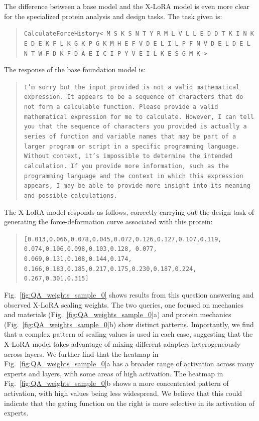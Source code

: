 The difference between a base model and the X-LoRA model is even more clear for the specialized protein analysis and design tasks. The task given is:
\begin{quote}
\small\texttt{CalculateForceHistory< M S K S N T Y R M L V L L E D D T K I N K E D E K F L K G K P G K M H E F V D E L I L P F N V D E L D E L N T W F D K F D A E I C I P Y V E I L K E S G M K > }
\end{quote}
The response of the base foundation model is:
\begin{quote}
\small\texttt{I'm sorry but the input provided is not a valid mathematical expression. It appears to be a sequence of characters that do not form a calculable function. Please provide a valid mathematical expression for me to calculate.
\newline\newline
However, I can tell you that the sequence of characters you provided is actually a series of function and variable names that may be part of a larger program or script in a specific programming language. Without context, it's impossible to determine the intended calculation.
\newline\newline
If you provide more information, such as the programming language and the context in which this expression appears, I may be able to provide more insight into its meaning and possible calculations. }
\end{quote}
The X-LoRA model responds as follows, correctly carrying out the design task of generating the force-deformation curve associated with this protein:
\begin{quote}
\small\texttt{[0.013,0.066,0.078,0.045,0.072,0.126,0.127,0.107,0.119, 
0.074,0.106,0.098,0.103,0.128,
0.077, 0.069,0.131,0.108,0.144,0.174, 
0.166,0.183,0.185,0.217,0.175,0.230,0.187,0.224,
0.267,0.301,0.315]}
\end{quote}



Fig.~\ref{fig:QA_weights_sample_0} shows results from this question answering and observed X-LoRA scaling weights.  The two queries, one focused on mechanics and materials (Fig.~\ref{fig:QA_weights_sample_0}a) and protein mechanics (Fig.~\ref{fig:QA_weights_sample_0}b) show distinct patterns.  Importantly, we find that a complex pattern of scaling values is used in each case, suggesting that the X-LoRA model takes advantage of mixing different adapters heterogeneously across layers. We further find that the heatmap in Fig.~\ref{fig:QA_weights_sample_0}a has a broader range of activation across many experts and layers, with some areas of high activation. The heatmap in Fig.~\ref{fig:QA_weights_sample_0}b shows a more concentrated pattern of activation, with high values being less widespread. We believe that this could indicate that the gating function on the right is more selective in its activation of experts.

